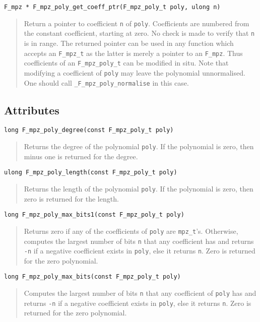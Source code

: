 \documentclass[a4paper,10pt]{article}
\newcommand{\code}{\lstinline}
\begin{document}
\begin{lstlisting}
F_mpz * F_mpz_poly_get_coeff_ptr(F_mpz_poly_t poly, ulong n)
\end{lstlisting}
\begin{quote}
Return a pointer to coefficient \code{n} of \code{poly}. Coefficients are numbered from the constant 
coefficient, starting at zero. No check is made to verify that \code{n} is in range. The returned 
pointer can be used in any function which accepts an \code{F_mpz_t} as the latter is merely a pointer
to an \code{F_mpz}. Thus coefficients of an \code{F_mpz_poly_t} can be modified in situ. Note that
modifying a coefficient of \code{poly} may leave the polynomial unnormalised. One should call 
\code{_F_mpz_poly_normalise} in this case.
\end{quote}

\subsection{Attributes}

\begin{lstlisting}
long F_mpz_poly_degree(const F_mpz_poly_t poly)
\end{lstlisting}
\begin{quote}
Returns the degree of the polynomial \code{poly}. If the polynomial is zero, then minus one is returned 
for the degree.
\end{quote}

\begin{lstlisting}
ulong F_mpz_poly_length(const F_mpz_poly_t poly)
\end{lstlisting}
\begin{quote}
Returns the length of the polynomial \code{poly}. If the polynomial is zero, then zero is returned 
for the length.
\end{quote}

\begin{lstlisting}
long F_mpz_poly_max_bits1(const F_mpz_poly_t poly)
\end{lstlisting}
\begin{quote}
Returns zero if any of the coefficients of \code{poly} are \code{mpz_t}'s. Otherwise, computes the 
largest number of bits \code{n} that any coefficient has and returns \code{-n} if a negative coefficient 
exists in \code{poly}, else it returns \code{n}. Zero is returned for the zero polynomial.
\end{quote}

\begin{lstlisting}
long F_mpz_poly_max_bits(const F_mpz_poly_t poly)
\end{lstlisting}
\begin{quote}
Computes the largest number of bits \code{n} that any coefficient of \code{poly} has and returns 
\code{-n} if a negative coefficient exists in \code{poly}, else it returns \code{n}. Zero is 
returned for the zero polynomial.
\end{quote}
\end{document}
